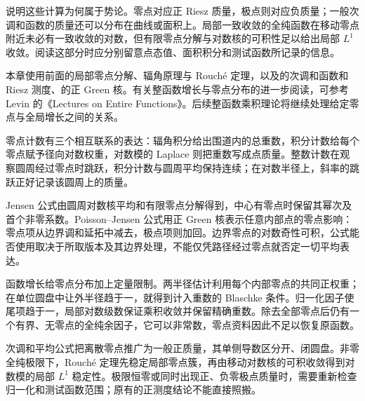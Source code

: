 \ProseParagraphBreak
{}说明这些计算为何属于势论。零点对应正 Riesz 质量，极点则对应负质量；一般次调和函数的质量还可以分布在曲线或面积上。局部一致收敛的全纯函数在移动零点附近未必有一致收敛的对数，但有限零点分解与对数核的可积性足以给出局部 \(L^1\) 收敛。阅读这部分时应分别留意点态值、面积积分和测试函数所记录的信息。

\ProseParagraphBreak
本章使用前面的局部零点分解、辐角原理与 Rouch\'e 定理，以及的次调和函数和 Riesz 测度、的正 Green 核。有关整函数增长与零点分布的进一步阅读，可参考 Levin 的《Lectures on Entire Functions》\cite{Levin1996Lectures}。后续整函数乘积理论将继续处理给定零点与全局增长之间的关系。





\begin{chaptersummary}
零点计数有三个相互联系的表达：辐角积分给出围道内的总重数，积分计数给每个零点赋予径向对数权重，对数模的 Laplace 则把重数写成点质量。整数计数在观察圆周经过零点时跳跃，积分计数与圆周平均保持连续；在对数半径上，斜率的跳跃正好记录该圆周上的质量。

\ProseParagraphBreak
Jensen 公式由圆周对数核平均和有限零点分解得到，中心有零点时保留其幂次及首个非零系数。Poisson--Jensen 公式用正 Green 核表示任意内部点的零点影响：零点项从边界调和延拓中减去，极点项则加回。边界零点的对数奇性可积，公式能否使用取决于所取版本及其边界处理，不能仅凭路径经过零点就否定一切平均表达。

\ProseParagraphBreak
函数增长给零点分布加上定量限制。两半径估计利用每个内部零点的共同正权重；在单位圆盘中让外半径趋于一，就得到计入重数的 Blaschke 条件。归一化因子使尾项趋于一，局部对数级数保证乘积收敛并保留精确重数。除去全部零点后仍有一个有界、无零点的全纯余因子，它可以非常数，零点资料因此不足以恢复原函数。

\ProseParagraphBreak
次调和平均公式把离散零点推广为一般正质量，其单侧导数区分开、闭圆盘。非零全纯极限下，Rouch\'e 定理先稳定局部零点簇，再由移动对数核的可积收敛得到对数模的局部 \(L^1\) 稳定性。极限恒零或同时出现正、负零极点质量时，需要重新检查归一化和测试函数范围；原有的正测度结论不能直接照搬。
\end{chaptersummary}

\BookExercises

